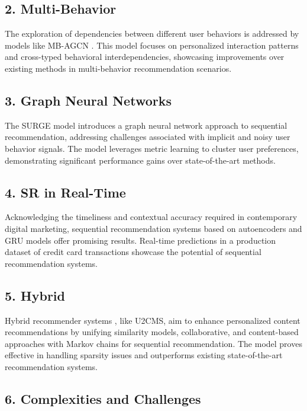 \documentclass[journal]{IEEEtran}
\begin{document}
\subsection*{2. Multi-Behavior}

The exploration of dependencies between different user behaviors is addressed by models like MB-AGCN \cite{PENG2023111040}. This model focuses on 
personalized interaction patterns and cross-typed behavioral interdependencies, showcasing improvements over existing methods 
in multi-behavior recommendation scenarios.

\subsection*{3. Graph Neural Networks}

The SURGE model \cite{10.1145/3404835.3462968} introduces a graph neural network approach to sequential recommendation, addressing challenges associated with 
implicit and noisy user behavior signals. The model leverages metric learning to cluster user preferences, demonstrating significant 
performance gains over state-of-the-art methods.

\subsection*{4. SR in Real-Time}

Acknowledging the timeliness and contextual accuracy required in contemporary digital marketing, sequential recommendation systems 
based on autoencoders and GRU models offer promising results. Real-time predictions \cite{SRMNPP} in a production dataset of credit card transactions 
showcase the potential of sequential recommendation systems.

\subsection*{5. Hybrid}

Hybrid recommender systems \cite{SRMNPP,9207880}, like U2CMS, aim to enhance personalized content recommendations by unifying similarity models, 
collaborative, and content-based approaches with Markov chains for sequential recommendation. The model proves effective in handling 
sparsity issues and outperforms existing state-of-the-art recommendation systems.

\subsection*{6. Complexities and Challenges}
\end{document}
